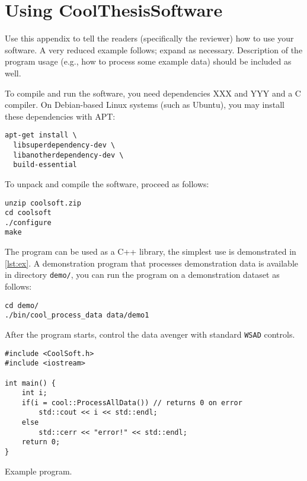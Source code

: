 \chapter{Using CoolThesisSoftware}

Use this appendix to tell the readers (specifically the reviewer) how to use your software. A very reduced example follows; expand as necessary. Description of the program usage (e.g., how to process some example data) should be included as well.

To compile and run the software, you need dependencies XXX and YYY and a C compiler. On Debian-based Linux systems (such as Ubuntu), you may install these dependencies with APT:
\begin{Verbatim}
apt-get install \
  libsuperdependency-dev \
  libanotherdependency-dev \
  build-essential
\end{Verbatim}

To unpack and compile the software, proceed as follows:
\begin{Verbatim}
unzip coolsoft.zip
cd coolsoft
./configure
make
\end{Verbatim}

The program can be used as a C++ library, the simplest use is demonstrated in \cref{lst:ex}. A demonstration program that processes demonstration data is available in directory \verb|demo/|, you can run the program on a demonstration dataset as follows:
\begin{Verbatim}
cd demo/
./bin/cool_process_data data/demo1
\end{Verbatim}

After the program starts, control the data avenger with standard \verb-WSAD- controls.

\begin{listing}
\begin{lstlisting}
#include <CoolSoft.h>
#include <iostream>

int main() {
	int i;
	if(i = cool::ProcessAllData()) // returns 0 on error
		std::cout << i << std::endl;
	else
		std::cerr << "error!" << std::endl;
	return 0;
}
\end{lstlisting}
\caption{Example program.}
\label{lst:ex}
\end{listing}

